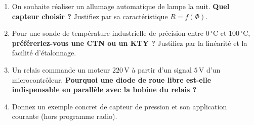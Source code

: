\documentclass[11pt]{article}
\begin{document}
\begin{exercice}
\begin{enumerate}
    \item On souhaite réaliser un allumage automatique de lampe la nuit. \textbf{Quel capteur choisir ?} Justifiez par sa caractéristique $R = f(\Phi)$.
    \item Pour une sonde de température industrielle de précision entre $0\,^{\circ}\mathrm{C}$ et $100\,^{\circ}\mathrm{C}$, \textbf{préféreriez-vous une CTN ou un KTY ?} Justifiez par la linéarité et la facilité d'étalonnage.
    \item Un relais commande un moteur $220\,\text{V}$ à partir d'un signal $5\,\text{V}$ d'un microcontrôleur. \textbf{Pourquoi une diode de roue libre est-elle indispensable en parallèle avec la bobine du relais ?}
    \item Donnez un exemple concret de capteur de pression et son application courante (hors programme radio).
\end{enumerate}
\end{exercice}
\end{document}
